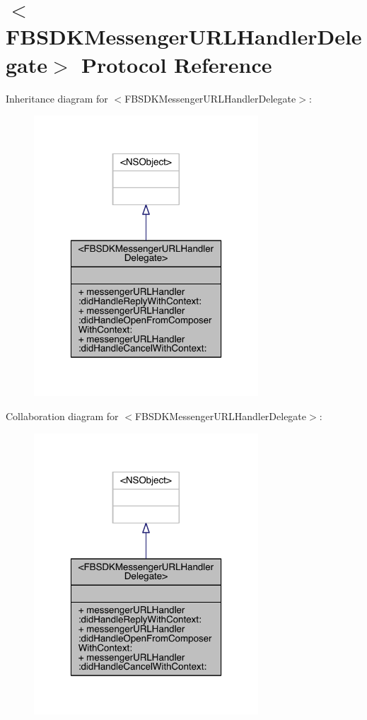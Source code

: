 \hypertarget{protocol_f_b_s_d_k_messenger_u_r_l_handler_delegate-p}{\section{$<$F\-B\-S\-D\-K\-Messenger\-U\-R\-L\-Handler\-Delegate$>$ Protocol Reference}
\label{protocol_f_b_s_d_k_messenger_u_r_l_handler_delegate-p}
}


Inheritance diagram for $<$F\-B\-S\-D\-K\-Messenger\-U\-R\-L\-Handler\-Delegate$>$\-:
\nopagebreak
\begin{figure}[H]
\begin{center}
\leavevmode
\includegraphics[width=238pt]{protocol_f_b_s_d_k_messenger_u_r_l_handler_delegate-p__inherit__graph}
\end{center}
\end{figure}


Collaboration diagram for $<$F\-B\-S\-D\-K\-Messenger\-U\-R\-L\-Handler\-Delegate$>$\-:
\nopagebreak
\begin{figure}[H]
\begin{center}
\leavevmode
\includegraphics[width=238pt]{protocol_f_b_s_d_k_messenger_u_r_l_handler_delegate-p__coll__graph}
\end{center}
\end{figure}
